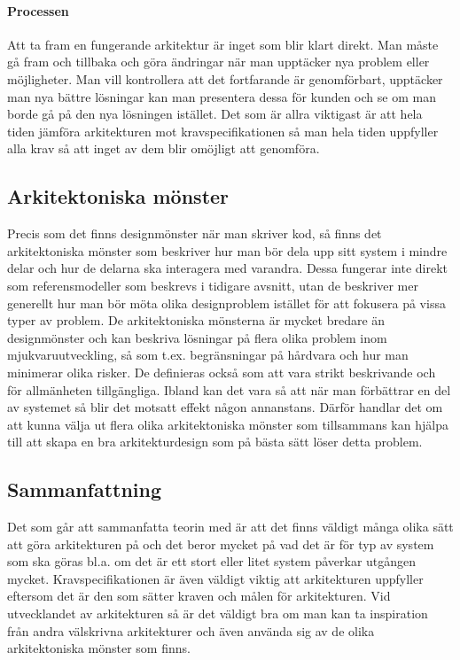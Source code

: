 \paragraph{Processen}
Att ta fram en fungerande arkitektur är inget som blir klart direkt. Man måste gå fram och tillbaka och göra ändringar när man upptäcker nya problem eller möjligheter. Man vill kontrollera att det fortfarande är genomförbart, upptäcker man nya bättre lösningar kan man presentera dessa för kunden och se om man borde gå på den nya lösningen istället. Det som är allra viktigast är att hela tiden jämföra arkitekturen mot kravspecifikationen så man hela tiden uppfyller alla krav så att inget av dem blir omöjligt att genomföra. \cite[s. 228--230]{set} %

\subsection{Arkitektoniska mönster}
Precis som det finns designmönster när man skriver kod, så finns det arkitektoniska mönster som beskriver hur man bör dela upp sitt system i mindre delar och hur de delarna ska interagera med varandra. Dessa fungerar inte direkt som referensmodeller som beskrevs i tidigare avsnitt, utan de beskriver mer generellt hur man bör möta olika designproblem istället för att fokusera på vissa typer av problem.
\newline
\newline
De arkitektoniska mönsterna är mycket bredare än designmönster och kan beskriva lösningar på flera olika problem inom mjukvaruutveckling, så som t.ex. begränsningar på hårdvara och hur man minimerar olika risker. De definieras också som att vara strikt beskrivande och för allmänheten tillgängliga.
\newline
\newline
Ibland kan det vara så att när man förbättrar en del av systemet så blir det motsatt effekt någon annanstans. Därför handlar det om att kunna välja ut flera olika arkitektoniska mönster som tillsammans kan hjälpa till att skapa en bra arkitekturdesign som på bästa sätt löser detta problem. \cite[s. 226--228]{set}

\subsection{Sammanfattning}
Det som går att sammanfatta teorin med är att det finns väldigt många olika sätt att göra arkitekturen på och det beror mycket på vad det är för typ av system som ska göras bl.a. om det är ett stort eller litet system påverkar utgången mycket. Kravspecifikationen är även väldigt viktig att arkitekturen uppfyller eftersom det är den som sätter kraven och målen för arkitekturen.
\newline
\newline
Vid utvecklandet av arkitekturen så är det väldigt bra om man kan ta inspiration från andra välskrivna arkitekturer och även använda sig av de olika arkitektoniska mönster som finns.
